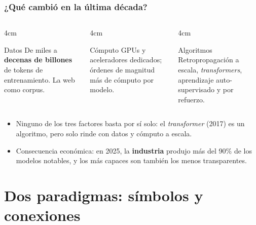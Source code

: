 \documentclass[aspectratio=169, 10pt]{beamer}
\begin{document}
\begin{frame}
\frametitle{¿Qué cambió en la última década?}
\begin{columns}[T]
\begin{column}{4cm}
\begin{block}{Datos}
De miles a \textbf{decenas de billones} de tokens de entrenamiento. La web como corpus.
\end{block}
\end{column}
\begin{column}{4cm}
\begin{block}{Cómputo}
GPUs y aceleradores dedicados; \'ordenes de magnitud m\'as de c\'omputo por modelo.
\end{block}
\end{column}
\begin{column}{4cm}
\begin{block}{Algoritmos}
Retropropagaci\'on a escala, \emph{transformers}, aprendizaje auto-supervisado y por refuerzo.
\end{block}
\end{column}
\end{columns}
\vspace{0.8em}
\pause
\begin{itemize}
	\item Ninguno de los tres factores basta por s\'i solo: el \emph{transformer} (2017) es un algoritmo, pero solo rinde con datos y c\'omputo a escala.
	\item Consecuencia econ\'omica: en 2025, la \textbf{industria} produjo m\'as del 90\% de los modelos notables, y los m\'as capaces son tambi\'en los menos transparentes.
\end{itemize}
\end{frame}

\section{Dos paradigmas: símbolos y conexiones}
\end{document}
